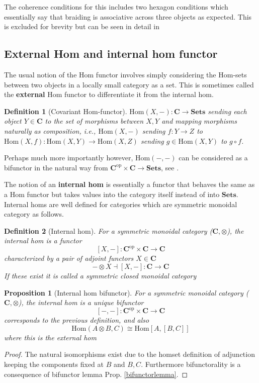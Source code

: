 \documentclass[12pt]{article}
\numberwithin{equation}{section}
\newcommand{\Hom}{{\mathrm{Hom}}}
\newtheorem{definition}{Definition}[section]
\newtheorem{proposition}{Proposition}[section]
\begin{document}
\begin{appendices}
		The coherence conditions for this includes two hexagon conditions which essentially say that braiding is associative across three objects as expected. This is excluded for brevity but can be seen in detail in \cite{nlab:braided_monoidal_category}	
		
		\subsection{External Hom and internal hom functor}
		The usual notion of the Hom functor involves simply considering the Hom-sets between two objects in a locally small category as a set. This is sometimes called the \textbf{external} Hom functor to differentiate it from the internal hom.
		\begin{definition}[Covariant Hom-functor]
			$\Hom(X,-): \mathbf{C} \to \mathbf{Sets}$ sending each object $Y \in \mathbf{C}$ to the set of morphisms between $X,Y$ and mapping morphisms naturally as composition, i.e., $\Hom(X,-)$ sending $f:Y \to Z$ to $\Hom(X,f): \Hom(X,Y)\to \Hom(X,Z)$
			sending $g\in \Hom(X,Y)$ to $g \circ f$.
		\end{definition}
		
		Perhaps much more importantly however, $\Hom(-,-)$ can be considered as a bifunctor in the natural way from $\mathbf{C}^{\mathrm{op}}\times \mathbf{C} \to \mathbf{Sets}$, see \cite{nlab:hom-functor}.
		
		The notion of an \textbf{internal hom} is essentially a functor that behaves the same as a Hom functor but takes values into the category itself instead of into $\mathbf{Sets}$.
		Internal homs are well defined for categories which are symmetric monoidal category as follows.
		
		\begin{definition}[Internal hom]
			For a symmetric monoidal category ($\mathbf{C}, \otimes$), the internal hom is a functor \[ [X,-]: \mathbf{C}^{\mathrm{op}} \times \mathbf{C} \to \mathbf{C}\]
			characterized by a pair of adjoint functors $X \in \mathbf{C}$ \[ -\otimes X \dashv [X,-]: \mathbf{C}  \to \mathbf{C}\] If these exist it is called a symmetric closed monoidal category
		\end{definition}
		
		\begin{proposition}[Internal hom bifunctor]\label{hombifunctor}
			For a symmetric monoidal category ($\mathbf{C}, \otimes$), the internal hom is a unique bifunctor \[ [-,-]: \mathbf{C}^{\mathrm{op}} \times \mathbf{C} \to \mathbf{C}\]
			corresponds to the previous definition, and also \[  \Hom (A \otimes B, C) \cong \Hom[A, [B,C]]\] where this is the external hom
		\end{proposition}
		\begin{proof}
			The natural isomorphisms exist due to the homset definition of adjunction keeping the components fixed at $B$ and $B, C $. Furthermore bifunctorality is a consequence of bifunctor lemma Prop. \ref{bifunctorlemma}.
		\end{proof}
		

\end{appendices}
\end{document}
